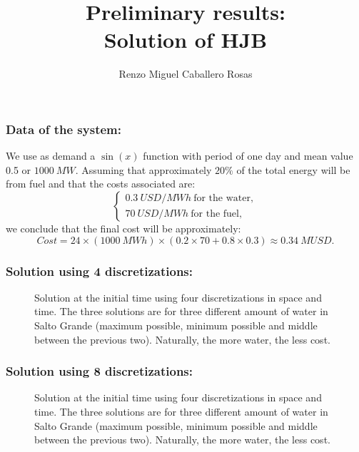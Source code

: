 \documentclass[aspectratio=169]{beamer}\usepackage[utf8]{inputenc}
\title{Preliminary results:\\
Solution of HJB}
\subtitle{Renzo Miguel Caballero Rosas}
\begin{document}
\begin{frame}
\titlepage
\end{frame}

\begin{frame}\frametitle{Data of the system:}
We use as demand a $\sin(x)$ function with period of one day and mean value 0.5 or $\SI{1000}{MW}$. Assuming that approximately $20 \%$ of the total energy will be from fuel and that the costs associated are:
\begin{equation*}
\begin{cases}
\SI{0.3}{USD/MWh}\ \text{for the water},\\
\SI{70}{USD/MWh}\ \text{for the fuel},
\end{cases}
\end{equation*}
we conclude that the final cost will be approximately:
\begin{equation*}
Cost=24\times(\SI{1000}{MWh})\times(0.2\times70+0.8\times0.3)\approx\SI{0.34}{M USD}.
\end{equation*}
\end{frame}

\begin{frame}\frametitle{Solution using 4 discretizations:}
\begin{figure}[ht!]
\centering
{}
\caption{Solution at the initial time using four discretizations in space and time. The three solutions are for three different amount of water in Salto Grande (maximum possible, minimum possible and middle between the previous two). Naturally, the more water, the less cost.}
\end{figure}
\end{frame}

\begin{frame}\frametitle{Solution using 8 discretizations:}
\begin{figure}[ht!]
\centering
{}
\caption{Solution at the initial time using four discretizations in space and time. The three solutions are for three different amount of water in Salto Grande (maximum possible, minimum possible and middle between the previous two). Naturally, the more water, the less cost.}
\end{figure}
\end{frame}
\end{document}
